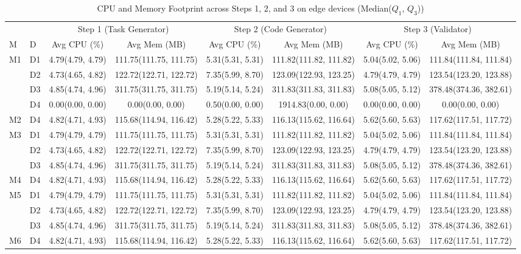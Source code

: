 \begin{table}[t]
\centering
\caption{CPU and Memory Footprint across Steps 1, 2, and 3 on edge devices (Median($Q_1$, $Q_3$))}
\begin{tabular}{llcccccc}
\hline
 & & \multicolumn{2}{c}{Step 1 (Task Generator)} & \multicolumn{2}{c}{Step 2 (Code Generator)} & \multicolumn{2}{c}{Step 3 (Validator)} \\
\cline{3-8}
M & D & Avg CPU (\%) & Avg Mem (MB) & Avg CPU (\%) & Avg Mem (MB) & Avg CPU (\%) & Avg Mem (MB) \\
\hline
M1 & D1 & 4.79(4.79, 4.79) & 111.75(111.75, 111.75) & 5.31(5.31, 5.31) & 111.82(111.82, 111.82) & 5.04(5.02, 5.06) & 111.84(111.84, 111.84) \\
 & D2 & 4.73(4.65, 4.82) & 122.72(122.71, 122.72) & 7.35(5.99, 8.70) & 123.09(122.93, 123.25) & 4.79(4.79, 4.79) & 123.54(123.20, 123.88) \\
 & D3 & 4.85(4.74, 4.96) & 311.75(311.75, 311.75) & 5.19(5.14, 5.24) & 311.83(311.83, 311.83) & 5.08(5.05, 5.12) & 378.48(374.36, 382.61) \\
 & D4 & 0.00(0.00, 0.00) & 0.00(0.00, 0.00) & 0.50(0.00, 0.00) & 1914.83(0.00, 0.00) & 0.00(0.00, 0.00) & 0.00(0.00, 0.00) \\
M2 & D4 & 4.82(4.71, 4.93) & 115.68(114.94, 116.42) & 5.28(5.22, 5.33) & 116.13(115.62, 116.64) & 5.62(5.60, 5.63) & 117.62(117.51, 117.72) \\
M3 & D1 & 4.79(4.79, 4.79) & 111.75(111.75, 111.75) & 5.31(5.31, 5.31) & 111.82(111.82, 111.82) & 5.04(5.02, 5.06) & 111.84(111.84, 111.84) \\
 & D2 & 4.73(4.65, 4.82) & 122.72(122.71, 122.72) & 7.35(5.99, 8.70) & 123.09(122.93, 123.25) & 4.79(4.79, 4.79) & 123.54(123.20, 123.88) \\
 & D3 & 4.85(4.74, 4.96) & 311.75(311.75, 311.75) & 5.19(5.14, 5.24) & 311.83(311.83, 311.83) & 5.08(5.05, 5.12) & 378.48(374.36, 382.61) \\
M4 & D4 & 4.82(4.71, 4.93) & 115.68(114.94, 116.42) & 5.28(5.22, 5.33) & 116.13(115.62, 116.64) & 5.62(5.60, 5.63) & 117.62(117.51, 117.72) \\
M5 & D1 & 4.79(4.79, 4.79) & 111.75(111.75, 111.75) & 5.31(5.31, 5.31) & 111.82(111.82, 111.82) & 5.04(5.02, 5.06) & 111.84(111.84, 111.84) \\
 & D2 & 4.73(4.65, 4.82) & 122.72(122.71, 122.72) & 7.35(5.99, 8.70) & 123.09(122.93, 123.25) & 4.79(4.79, 4.79) & 123.54(123.20, 123.88) \\
 & D3 & 4.85(4.74, 4.96) & 311.75(311.75, 311.75) & 5.19(5.14, 5.24) & 311.83(311.83, 311.83) & 5.08(5.05, 5.12) & 378.48(374.36, 382.61) \\
M6 & D4 & 4.82(4.71, 4.93) & 115.68(114.94, 116.42) & 5.28(5.22, 5.33) & 116.13(115.62, 116.64) & 5.62(5.60, 5.63) & 117.62(117.51, 117.72) \\
\hline
\end{tabular}
\label{tab:cpu_mem_footprint}
\end{table}


